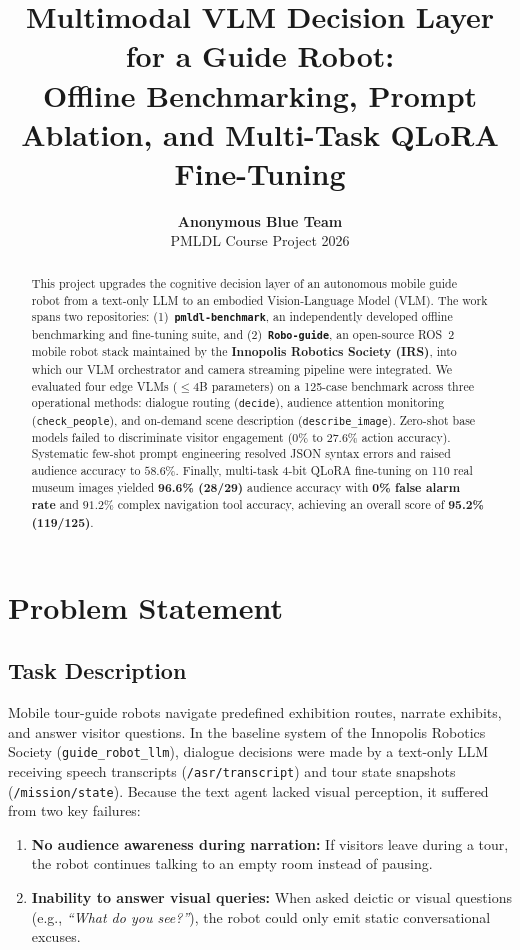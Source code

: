 ﻿\documentclass[11pt,a4paper]{article}
\title{\textbf{Multimodal VLM Decision Layer for a Guide Robot:\\Offline Benchmarking, Prompt Ablation, and Multi-Task QLoRA Fine-Tuning}}
\author{\textbf{Anonymous Blue Team} \\ PMLDL Course Project 2026}
\date{}
\begin{document}
\maketitle

\begin{abstract}
This project upgrades the cognitive decision layer of an autonomous mobile guide robot from a text-only LLM to an embodied Vision-Language Model (VLM). The work spans two repositories: (1)~\textbf{\texttt{pmldl-benchmark}}, an independently developed offline benchmarking and fine-tuning suite, and (2)~\textbf{\texttt{Robo-guide}}, an open-source ROS~2 mobile robot stack maintained by the \textbf{Innopolis Robotics Society (IRS)}, into which our VLM orchestrator and camera streaming pipeline were integrated. We evaluated four edge VLMs ($\le 4$B parameters) on a 125-case benchmark across three operational methods: dialogue routing (\texttt{decide}), audience attention monitoring (\texttt{check\_people}), and on-demand scene description (\texttt{describe\_image}). Zero-shot base models failed to discriminate visitor engagement ($0\%$ to $27.6\%$ action accuracy). Systematic few-shot prompt engineering resolved JSON syntax errors and raised audience accuracy to $58.6\%$. Finally, multi-task 4-bit QLoRA fine-tuning on 110 real museum images yielded \textbf{96.6\% (28/29)} audience accuracy with \textbf{0\% false alarm rate} and $91.2\%$ complex navigation tool accuracy, achieving an overall score of \textbf{95.2\% (119/125)}.
\end{abstract}

\section{Problem Statement}

\subsection{Task Description}
Mobile tour-guide robots navigate predefined exhibition routes, narrate exhibits, and answer visitor questions. In the baseline system of the Innopolis Robotics Society (\texttt{guide\_robot\_llm}), dialogue decisions were made by a text-only LLM receiving speech transcripts (\texttt{/asr/transcript}) and tour state snapshots (\texttt{/mission/state}). Because the text agent lacked visual perception, it suffered from two key failures:
\begin{enumerate}
    \item \textbf{No audience awareness during narration:} If visitors leave during a tour, the robot continues talking to an empty room instead of pausing.
    \item \textbf{Inability to answer visual queries:} When asked deictic or visual questions (e.g., \textit{``What do you see?''}), the robot could only emit static conversational excuses.
\end{enumerate}
\end{document}
